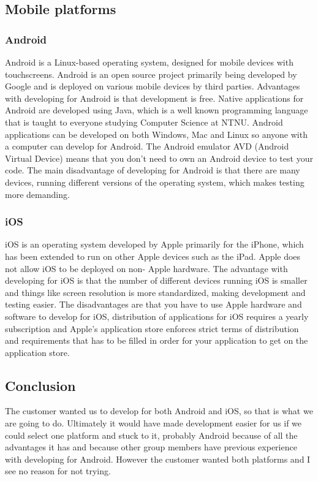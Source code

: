 \subsection{Mobile platforms}

\subsubsection*{Android}

    Android is a Linux-based operating system, designed for mobile devices with touchscreens.
    Android is an open source project primarily being developed by Google and is deployed on various
    mobile devices by third parties.\cite{android} Advantages with developing for Android is that
    development is free. Native applications for Android are developed using Java, which is a well
    known programming language that is taught to everyone studying Computer Science at NTNU. Android
    applications can be developed on both Windows, Mac and Linux so anyone with a computer can
    develop for Android. The Android emulator AVD (Android Virtual Device) means that you don't need
    to own an Android device to test your code. The main disadvantage of developing for Android is
    that there are many devices, running different versions of the operating system, which makes
    testing more demanding.

\subsubsection*{iOS}

    iOS is an operating system developed by Apple primarily for the iPhone, which has been extended
    to run on other Apple devices such as the iPad. Apple does not allow iOS to be deployed on non-
    Apple hardware.\cite{ios} The advantage with developing for iOS is that the number of different
    devices running iOS is smaller and things like screen resolution is more standardized, making
    development and testing easier. The disadvantages are that you have to use Apple hardware and
    software to develop for iOS, distribution of applications for iOS requires a yearly
    subscription\cite{iosCost} and Apple's application store enforces strict terms of distribution
    and requirements that has to be filled in order for your application to get on the application
    store.

\subsection{Conclusion}

    The customer wanted us to develop for both Android and iOS, so that is what we are going to do.
    Ultimately it would have made development easier for us if we could select one platform and
    stuck to it, probably Android because of all the advantages it has and because other group
    members have previous experience with developing for Android. However the customer wanted both
    platforms and I see no reason for not trying.
